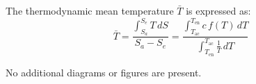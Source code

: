 The thermodynamic mean temperature \( \bar{T} \) is expressed as:  
\[
\bar{T} = \frac{\int_{S_a}^{S_e} T \, dS}{S_a - S_e} = \frac{\int_{T_{\text{ac}}}^{T_{\text{en}}} c \, f(T) \, dT}{\int_{T_{\text{en}}}^{T_{\text{ac}}} \frac{1}{T} \, dT}
\]  

No additional diagrams or figures are present.